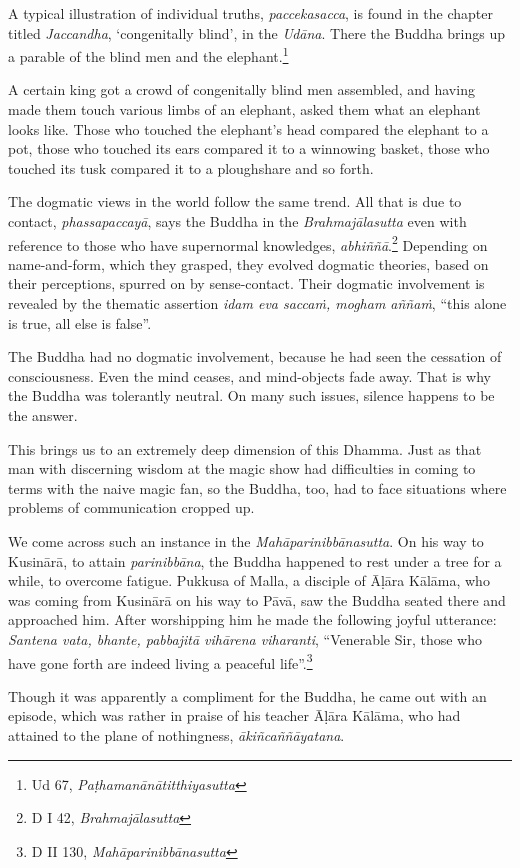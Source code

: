 A typical illustration of individual truths, \emph{paccekasacca}, is found in the chapter titled \emph{Jaccandha}, `congenitally blind', in the \emph{Udāna}. There the Buddha brings up a parable of the blind men and the elephant.\footnote{Ud 67, \emph{Paṭhamanānātitthiyasutta}}

A certain king got a crowd of congenitally blind men assembled, and having made them touch various limbs of an elephant, asked them what an elephant looks like. Those who touched the elephant's head compared the elephant to a pot, those who touched its ears compared it to a winnowing basket, those who touched its tusk compared it to a ploughshare and so forth.

The dogmatic views in the world follow the same trend. All that is due to contact, \emph{phassapaccayā}, says the Buddha in the \emph{Brahmajālasutta} even with reference to those who have supernormal knowledges, \emph{abhiññā}.\footnote{D I 42, \emph{Brahmajālasutta}} Depending on name-and-form, which they grasped, they evolved dogmatic theories, based on their perceptions, spurred on by sense-contact. Their dogmatic involvement is revealed by the thematic assertion \emph{idam eva saccaṁ, mogham aññaṁ}, ``this alone is true, all else is false''.

The Buddha had no dogmatic involvement, because he had seen the cessation of consciousness. Even the mind ceases, and mind-objects fade away. That is why the Buddha was tolerantly neutral. On many such issues, silence happens to be the answer.

This brings us to an extremely deep dimension of this Dhamma. Just as that man with discerning wisdom at the magic show had difficulties in coming to terms with the naive magic fan, so the Buddha, too, had to face situations where problems of communication cropped up.

We come across such an instance in the \emph{Mahāparinibbānasutta}. On his way to Kusinārā, to attain \emph{parinibbāna}, the Buddha happened to rest under a tree for a while, to overcome fatigue. Pukkusa of Malla, a disciple of Āḷāra Kālāma, who was coming from Kusinārā on his way to Pāvā, saw the Buddha seated there and approached him. After worshipping him he made the following joyful utterance: \emph{Santena vata, bhante, pabbajitā vihārena viharanti}, ``Venerable Sir, those who have gone forth are indeed living a peaceful life''.\footnote{D II 130, \emph{Mahāparinibbānasutta}}

Though it was apparently a compliment for the Buddha, he came out with an episode, which was rather in praise of his teacher Āḷāra Kālāma, who had attained to the plane of nothingness, \emph{ākiñcaññāyatana}.

